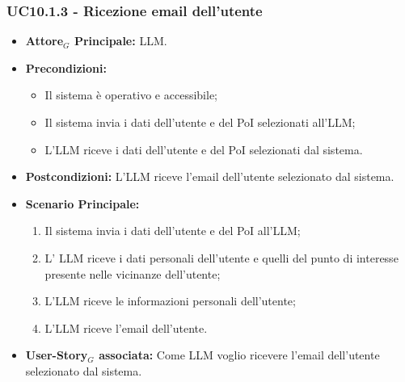 \documentclass[11pt]{article}
\begin{document}
\begin{justify}
\subsubsection{\textbf{UC10.1.3 - Ricezione email dell'utente}}
\begin{itemize}
    \item \textbf{Attore$_G$ Principale:} LLM.
    \item \textbf{Precondizioni:} 
        \begin{itemize}
          \item Il sistema è operativo e accessibile;
          \item Il sistema invia i dati dell'utente e del PoI selezionati all'LLM;
            \item L'LLM riceve i dati dell'utente e del PoI selezionati dal sistema.
        \end{itemize}
      \item \textbf{Postcondizioni:} L'LLM riceve l'email dell'utente selezionato dal sistema.
    \item \textbf{Scenario Principale:} 
        \begin{enumerate}
          \item Il sistema invia i dati dell'utente e del PoI all'LLM;
        \item L' LLM riceve i dati personali dell'utente e quelli del punto di interesse presente nelle vicinanze dell'utente;
          \item L'LLM riceve le informazioni personali dell'utente;
          \item L'LLM riceve l'email dell'utente.
        \end{enumerate}
      \item \textbf{User-Story$_G$ associata:} Come LLM voglio ricevere l'email dell'utente selezionato dal sistema.
\end{itemize}

\end{justify}
\end{document}
